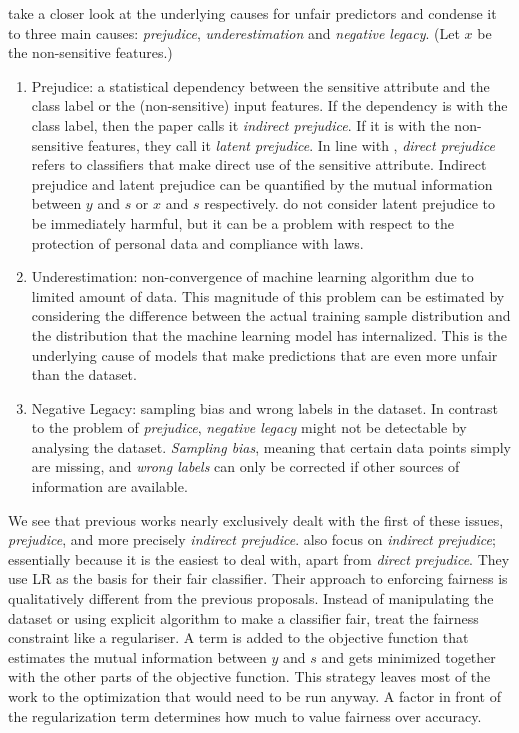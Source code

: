 \citet{kamishima2012fairness} take a closer look
at the underlying causes for unfair predictors and condense it to three main causes:
\emph{prejudice}, \emph{underestimation} and \emph{negative legacy}.
(Let \(x\) be the non-sensitive features.)

\begin{enumerate}
\item
  Prejudice:
  a statistical dependency between the sensitive attribute
  and the class label or the (non-sensitive) input features.
  If the dependency is with the class label, then the paper calls it \emph{indirect prejudice}.
  If it is with the non-sensitive features, they call it \emph{latent prejudice}.
  In line with \citet{pedreshi2008discrimination},
  \emph{direct prejudice} refers to classifiers that make direct use of the sensitive attribute.
  Indirect prejudice and latent prejudice can be quantified by
  the mutual information between \(y\) and \(s\) or \(x\) and \(s\) respectively.
  \citet{kamishima2012fairness} do not consider latent prejudice to be immediately harmful,
  but it can be a problem with respect to the protection of personal data and compliance with laws.
\item
  Underestimation:
  non-convergence of machine learning algorithm due to limited amount of data.
  This magnitude of this problem can be estimated
  by considering the difference between the actual training sample distribution
  and the distribution that the machine learning model has internalized.
  This is the underlying cause of models that make predictions
  that are even more unfair than the dataset.
\item
  Negative Legacy:
  sampling bias and wrong labels in the dataset.
  In contrast to the problem of \emph{prejudice},
  \emph{negative legacy} might not be detectable by analysing the dataset.
  \emph{Sampling bias}, meaning that certain data points simply are missing,
  and \emph{wrong labels} can only be corrected if other sources of information are available.
\end{enumerate}

We see that previous works nearly exclusively dealt with the first of these issues, \emph{prejudice},
and more precisely \emph{indirect prejudice}.
\citet{kamishima2012fairness} also focus on \emph{indirect prejudice};
essentially because it is the easiest to deal with, apart from \emph{direct prejudice}.
They use \acf{LR} as the basis for their fair classifier.
Their approach to enforcing fairness is qualitatively different from the previous proposals.
Instead of manipulating the dataset or using explicit algorithm to make a classifier fair,
\citet{kamishima2012fairness} treat the fairness constraint like a regulariser.
A term is added to the objective function
that estimates the mutual information between \(y\) and \(s\)
and gets minimized together with the other parts of the objective function.
This strategy leaves most of the work to the optimization that would need to be run anyway.
A factor in front of the regularization term determines how much to value fairness over accuracy.

